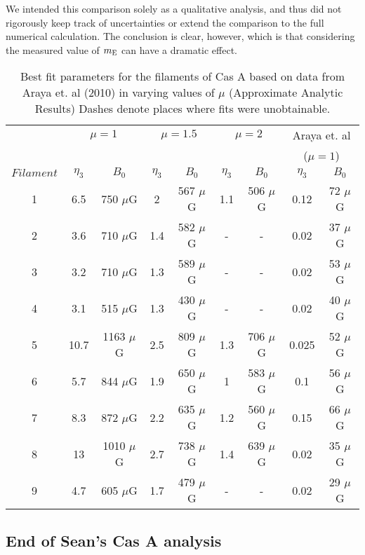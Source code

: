 \documentclass[manuscript]{aastex}  %
\begin{document}
We intended this comparison solely as a qualitative analysis, and thus did not
rigorously keep track of uncertainties or extend the comparison to the full
numerical calculation. The conclusion is clear, however, which is that
considering the measured value of $m_{\rm E}$ can have a dramatic effect.

\begin{table*}[h]
\caption{Best fit parameters for the filaments of Cas A based on data from
Araya et. al (2010) in varying values of $\mu$ (Approximate Analytic Results)
Dashes denote places where fits were unobtainable.}
\centering
\begin{tabular}{c c c c c c c c c}
\hline \hline
  &\multicolumn{2}{c}{$\mu = 1$} & \multicolumn{2}{c}{$\mu = 1.5$} & \multicolumn{2}{c}{$\mu = 2$} & \multicolumn{2}{c}{Araya et. al} \\
  & & & & & &  &\multicolumn{2}{c}{($\mu = 1$)} \\
$Filament$ &$\eta_{3}$ & $B_{0}$ &$\eta_{3}$ & $B_{0}$ & $\eta_{3}$ & $B_{0}$& $\eta_{3}$ & $B_{0}$ \\ [.5ex]
1 & 6.5  & 750 $\mu$G & 2 & 567 $\mu$G & 1.1 & 506 $\mu$G & 0.12 & 72 $\mu$G \\
2 & 3.6 & 710 $\mu$G & 1.4 & 582 $\mu$G & - & - & 0.02 & 37 $\mu$G\\
3 & 3.2 &  710 $\mu$G& 1.3 & 589 $\mu$G& - & - & 0.02 & 53 $\mu$G\\
4 & 3.1& 515 $\mu$G & 1.3 & 430 $\mu$G & -& - & 0.02 & 40 $\mu$G \\
5 & 10.7 & 1163 $\mu$G & 2.5 & 809 $\mu$G & 1.3&  706 $\mu$G & 0.025 & 52 $\mu$G \\
6 & 5.7 & 844 $\mu$G & 1.9 & 650 $\mu$G  & 1 & 583 $\mu$G & 0.1 & 56 $\mu$G \\
7 & 8.3 & 872 $\mu$G & 2.2 & 635 $\mu$G& 1.2 & 560 $\mu$G & 0.15 & 66 $\mu$G\\
8 & 13 & 1010 $\mu$G & 2.7 & 738 $\mu$G & 1.4 & 639 $\mu$G & 0.02 & 35 $\mu$G\\
9 & 4.7 & 605 $\mu$G & 1.7 & 479 $\mu$G & - & -& 0.02 & 29 $\mu$G\\

\hline
\hline
\end{tabular}
\label{tab:Araya}
\end{table*}

\subsection{End of Sean's Cas A analysis}
\end{document}
